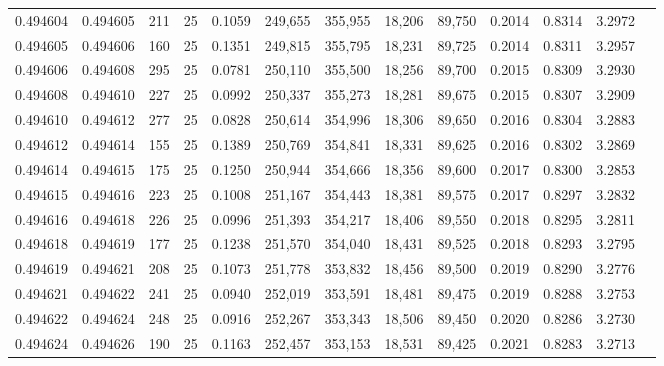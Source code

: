 \begin{tabular}{rrrrrrrrrrrrr}
0.494604 & 0.494605 &   211 &  25 &                                     0.1059 & 249,655 & 355,955 &  18,206 &  89,750 & 0.2014 & 0.8314 & 3.2972 \\
0.494605 & 0.494606 &   160 &  25 &                                     0.1351 & 249,815 & 355,795 &  18,231 &  89,725 & 0.2014 & 0.8311 & 3.2957 \\
0.494606 & 0.494608 &   295 &  25 &                                     0.0781 & 250,110 & 355,500 &  18,256 &  89,700 & 0.2015 & 0.8309 & 3.2930 \\
0.494608 & 0.494610 &   227 &  25 &                                     0.0992 & 250,337 & 355,273 &  18,281 &  89,675 & 0.2015 & 0.8307 & 3.2909 \\
0.494610 & 0.494612 &   277 &  25 &                                     0.0828 & 250,614 & 354,996 &  18,306 &  89,650 & 0.2016 & 0.8304 & 3.2883 \\
0.494612 & 0.494614 &   155 &  25 &                                     0.1389 & 250,769 & 354,841 &  18,331 &  89,625 & 0.2016 & 0.8302 & 3.2869 \\
0.494614 & 0.494615 &   175 &  25 &                                     0.1250 & 250,944 & 354,666 &  18,356 &  89,600 & 0.2017 & 0.8300 & 3.2853 \\
0.494615 & 0.494616 &   223 &  25 &                                     0.1008 & 251,167 & 354,443 &  18,381 &  89,575 & 0.2017 & 0.8297 & 3.2832 \\
0.494616 & 0.494618 &   226 &  25 &                                     0.0996 & 251,393 & 354,217 &  18,406 &  89,550 & 0.2018 & 0.8295 & 3.2811 \\
0.494618 & 0.494619 &   177 &  25 &                                     0.1238 & 251,570 & 354,040 &  18,431 &  89,525 & 0.2018 & 0.8293 & 3.2795 \\
0.494619 & 0.494621 &   208 &  25 &                                     0.1073 & 251,778 & 353,832 &  18,456 &  89,500 & 0.2019 & 0.8290 & 3.2776 \\
0.494621 & 0.494622 &   241 &  25 &                                     0.0940 & 252,019 & 353,591 &  18,481 &  89,475 & 0.2019 & 0.8288 & 3.2753 \\
0.494622 & 0.494624 &   248 &  25 &                                     0.0916 & 252,267 & 353,343 &  18,506 &  89,450 & 0.2020 & 0.8286 & 3.2730 \\
0.494624 & 0.494626 &   190 &  25 &                                     0.1163 & 252,457 & 353,153 &  18,531 &  89,425 & 0.2021 & 0.8283 & 3.2713 \\

\end{tabular}
